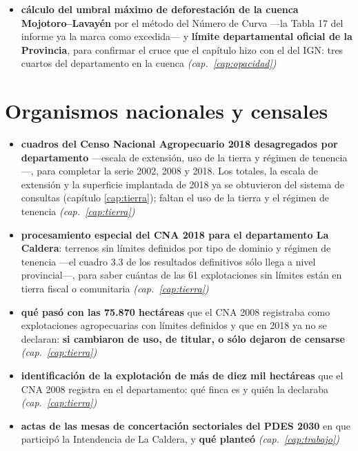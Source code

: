 \begin{itemize}[leftmargin=*,itemsep=0.35em]
\item \textbf{cálculo del umbral máximo de deforestación de la cuenca Mojotoro--Lavayén} por el método del Número de Curva ---la Tabla 17 del informe ya la marca como excedida--- y \textbf{límite departamental oficial de la Provincia}, para confirmar el cruce que el capítulo hizo con el del IGN: tres cuartos del departamento en la cuenca \textit{(cap.\ \ref{cap:opacidad})}
\end{itemize}

\section{Organismos nacionales y censales}

\begin{itemize}[leftmargin=*]
\item \textbf{cuadros del Censo Nacional Agropecuario 2018 desagregados por departamento} ---escala de extensión, uso de la tierra y régimen de tenencia---, para completar la serie 2002, 2008 y 2018. Los totales, la escala de extensión y la superficie implantada de 2018 ya se obtuvieron del sistema de consultas (capítulo \ref{cap:tierra}); faltan el uso de la tierra y el régimen de tenencia \textit{(cap.\ \ref{cap:tierra})}
\item \textbf{procesamiento especial del CNA 2018 para el departamento La Caldera}: terrenos sin límites definidos por tipo de dominio y régimen de tenencia ---el cuadro 3.3 de los resultados definitivos sólo llega a nivel provincial---, para saber cuántas de las 61 explotaciones sin límites están en tierra fiscal o comunitaria \textit{(cap.\ \ref{cap:tierra})}
\item \textbf{qué pasó con las 75.870 hectáreas} que el CNA 2008 registraba como explotaciones agropecuarias con límites definidos y que en 2018 ya no se declaran: \textbf{si cambiaron de uso, de titular, o sólo dejaron de censarse} \textit{(cap.\ \ref{cap:tierra})}
\item \textbf{identificación de la explotación de más de diez mil hectáreas} que el CNA 2008 registra en el departamento: qué finca es y quién la declaraba \textit{(cap.\ \ref{cap:tierra})}
\item \textbf{actas de las mesas de concertación sectoriales del PDES 2030} en que participó la Intendencia de La Caldera, y \textbf{qué planteó} \textit{(cap.\ \ref{cap:trabajo})}

\end{itemize}
